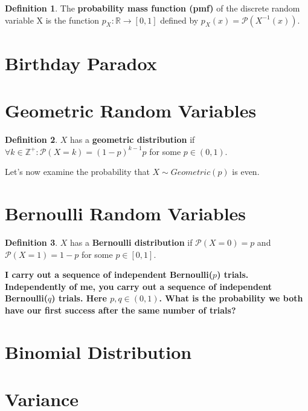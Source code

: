 \documentclass{article}
\theoremstyle{definition}
\newtheorem{definition}{Definition}
\newcommand{\Z}{\mathbb{Z}}
\newcommand{\R}{\mathbb{R}}
\newcommand{\Prob}{\mathcal{P}}
\begin{document}
\begin{definition}
    The \textbf{probability mass function (pmf)} of the discrete random variable X is
    the function $p_{X}:\R \xrightarrow{} [0,1]$ defined by $p_{X}(x) = \Prob(X^{-1}(x))$.
\end{definition}

\newpage

\section{Birthday Paradox}

\newpage

\section{Geometric Random Variables}

\begin{definition}
    $X$ has a \textbf{geometric distribution} if $\forall k \in \Z^{+}: \Prob(X = k) = (1-p)^{k-1}p$ for some $p \in (0,1)$.
\end{definition}

Let's now examine the probability that $X \sim Geometric(p)$ is even.



\newpage

\section{Bernoulli Random Variables}

\begin{definition}
    $X$ has a \textbf{Bernoulli distribution} if $\Prob(X = 0) = p$ and $\Prob(X = 1) = 1 - p$ for some $p \in [0,1]$.
\end{definition}

\textbf{I carry out a sequence of independent Bernoulli($p$) trials. Independently of me,
you carry out a sequence of independent Bernoulli($q$) trials. Here $p,q \in (0,1)$.
What is the probability we both have our first success after the same number of
trials?}

\newpage

\section{Binomial Distribution}



\newpage

\section{Variance}
\end{document}
